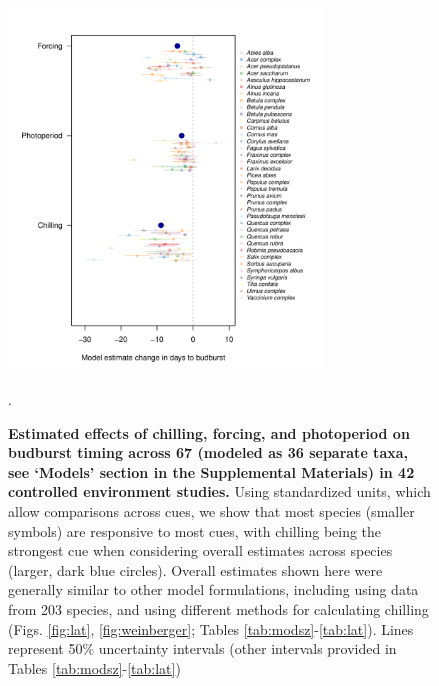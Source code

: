 \documentclass{article}
\begin{document}
\begin{figure}[h!]
\centering
\noindent \includegraphics[width=0.75\textwidth]{..//..//analyses/bb_analysis/figures/muplotspcompexprampfputah_z.pdf}
\caption{\textbf{Estimated effects of chilling, forcing, and photoperiod on budburst timing across 67 (modeled as 36 separate taxa, see `Models' section in the Supplemental Materials) in 42 controlled environment studies.} Using standardized units, which allow comparisons across cues, we show that most species (smaller symbols) are responsive to most cues, with chilling being the strongest cue when considering overall estimates across species (larger, dark blue circles). Overall estimates shown here were generally similar to other model formulations, including using data from 203 species, and using different methods for calculating chilling (Figs. \ref{fig:lat}, \ref{fig:weinberger}; Tables \ref{tab:modsz}-\ref{tab:lat}). Lines represent 50\% uncertainty intervals (other intervals provided in Tables \ref{tab:modsz}-\ref{tab:lat})}. %
\label{fig:mu}
\end{figure}

\newpage
\end{document}
